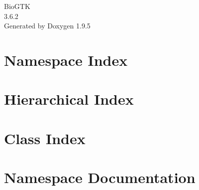 \documentclass[twoside]{book}
\newcommand{\+}{\discretionary{\mbox{\scriptsize$\hookleftarrow$}}{}{}}
\newcommand{\clearemptydoublepage}{%
    \newpage{\pagestyle{empty}\cleardoublepage}%
  }
\begin{document}
  \raggedbottom
    \hypersetup{pageanchor=false,
                bookmarksnumbered=true,
                pdfencoding=unicode
               }
  \begin{titlepage}
  \vspace*{7cm}
  \begin{center}%
  {\Large Bio\+GTK}\\
  [1ex]\large 3.\+6.\+2 \\
  \vspace*{1cm}
  {\large Generated by Doxygen 1.9.5}\\
  \end{center}
  \end{titlepage}
  \clearemptydoublepage
  \tableofcontents
  \clearemptydoublepage
  \hypersetup{pageanchor=true}
\chapter{Namespace Index}

\chapter{Hierarchical Index}

\chapter{Class Index}

\chapter{Namespace Documentation}



\end{document}
